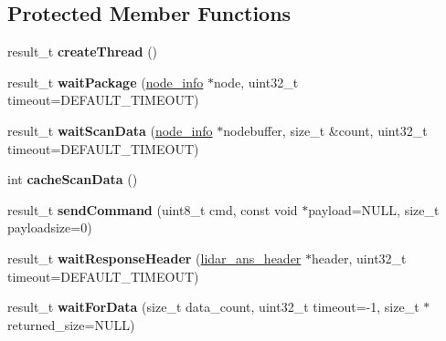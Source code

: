 \subsection*{Protected Member Functions}
\begin{DoxyCompactItemize}
\item 
result\+\_\+t {\bfseries create\+Thread} ()\hypertarget{classydlidar_1_1_y_dlidar_driver_a2d2b317fa6381009222e03670812e917}{}\label{classydlidar_1_1_y_dlidar_driver_a2d2b317fa6381009222e03670812e917}

\item 
result\+\_\+t {\bfseries wait\+Package} (\hyperlink{structnode__info}{node\+\_\+info} $\ast$node, uint32\+\_\+t timeout=D\+E\+F\+A\+U\+L\+T\+\_\+\+T\+I\+M\+E\+O\+UT)\hypertarget{classydlidar_1_1_y_dlidar_driver_aaf78903693f58c7f739dfa493573b3b1}{}\label{classydlidar_1_1_y_dlidar_driver_aaf78903693f58c7f739dfa493573b3b1}

\item 
result\+\_\+t {\bfseries wait\+Scan\+Data} (\hyperlink{structnode__info}{node\+\_\+info} $\ast$nodebuffer, size\+\_\+t \&count, uint32\+\_\+t timeout=D\+E\+F\+A\+U\+L\+T\+\_\+\+T\+I\+M\+E\+O\+UT)\hypertarget{classydlidar_1_1_y_dlidar_driver_a574996217284ce34191a2f3675a9f17b}{}\label{classydlidar_1_1_y_dlidar_driver_a574996217284ce34191a2f3675a9f17b}

\item 
int {\bfseries cache\+Scan\+Data} ()\hypertarget{classydlidar_1_1_y_dlidar_driver_ab462b22dc3a4d39fef4f722345a87d5e}{}\label{classydlidar_1_1_y_dlidar_driver_ab462b22dc3a4d39fef4f722345a87d5e}

\item 
result\+\_\+t {\bfseries send\+Command} (uint8\+\_\+t cmd, const void $\ast$payload=N\+U\+LL, size\+\_\+t payloadsize=0)\hypertarget{classydlidar_1_1_y_dlidar_driver_ab096ecdc3642c04e3e8b000e210c0962}{}\label{classydlidar_1_1_y_dlidar_driver_ab096ecdc3642c04e3e8b000e210c0962}

\item 
result\+\_\+t {\bfseries wait\+Response\+Header} (\hyperlink{structlidar__ans__header}{lidar\+\_\+ans\+\_\+header} $\ast$header, uint32\+\_\+t timeout=D\+E\+F\+A\+U\+L\+T\+\_\+\+T\+I\+M\+E\+O\+UT)\hypertarget{classydlidar_1_1_y_dlidar_driver_a0e089d615193ccef4bf488f63ff8130e}{}\label{classydlidar_1_1_y_dlidar_driver_a0e089d615193ccef4bf488f63ff8130e}

\item 
result\+\_\+t {\bfseries wait\+For\+Data} (size\+\_\+t data\+\_\+count, uint32\+\_\+t timeout=-\/1, size\+\_\+t $\ast$returned\+\_\+size=N\+U\+LL)\hypertarget{classydlidar_1_1_y_dlidar_driver_a03cb9fc8c33f9486182b44ac97690868}{}\label{classydlidar_1_1_y_dlidar_driver_a03cb9fc8c33f9486182b44ac97690868}


\end{DoxyCompactItemize}
